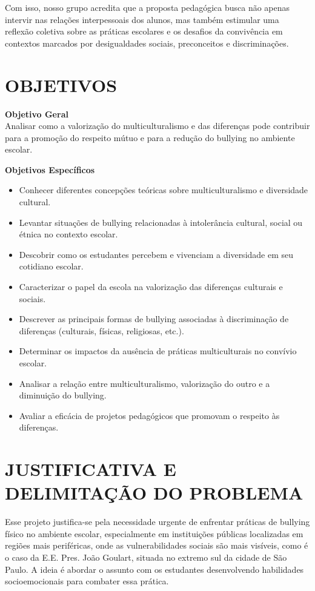 	Com isso, nosso grupo acredita que a proposta pedagógica busca não apenas intervir nas relações interpessoais dos alunos, mas também estimular uma reflexão coletiva sobre as práticas escolares e os desafios da convivência em contextos marcados por desigualdades sociais, preconceitos e discriminações. 

	\section{OBJETIVOS}
		\textbf{Objetivo Geral}\\
		Analisar como a valorização do multiculturalismo e das diferenças pode contribuir para a promoção do respeito mútuo e para a redução do bullying no ambiente escolar. 
		
		\textbf{Objetivos Específicos}
		\begin{itemize}[itemsep=0pt, topsep=0pt]
			\item Conhecer diferentes concepções teóricas sobre multiculturalismo e diversidade cultural. 
			\item Levantar situações de bullying relacionadas à intolerância cultural, social ou étnica no contexto escolar. 
			\item Descobrir como os estudantes percebem e vivenciam a diversidade em seu cotidiano escolar. 
			\item Caracterizar o papel da escola na valorização das diferenças culturais e sociais. 
			\item Descrever as principais formas de bullying associadas à discriminação de diferenças (culturais, físicas, religiosas, etc.). 
			\item Determinar os impactos da ausência de práticas multiculturais no convívio escolar. 
			\item Analisar a relação entre multiculturalismo, valorização do outro e a diminuição do bullying. 
			\item Avaliar a eficácia de projetos pedagógicos que promovam o respeito às diferenças. 
			
		\end{itemize}
	
	\section{JUSTIFICATIVA E DELIMITAÇÃO DO PROBLEMA}
	
		Esse projeto justifica-se pela necessidade urgente de enfrentar práticas de bullying físico no ambiente escolar, especialmente em instituições públicas localizadas em regiões mais periféricas, onde as vulnerabilidades sociais são mais visíveis, como é o caso da E.E. Pres. João Goulart, situada no extremo sul da cidade de São Paulo. A ideia é abordar o assunto com os estudantes desenvolvendo habilidades socioemocionais para combater essa prática.
		
